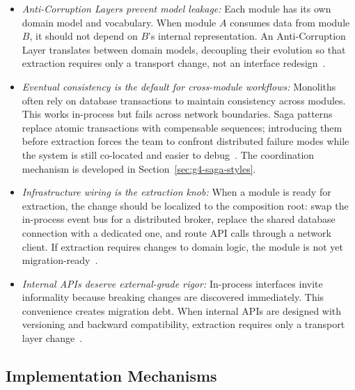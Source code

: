 \begin{itemize}[itemsep=8pt,topsep=2pt]
  \item \emph{Anti-Corruption Layers prevent model leakage:} Each module has its own domain model and vocabulary. When module $A$ consumes data from module $B$, it should not depend on $B$'s internal representation. An Anti-Corruption Layer translates between domain models, decoupling their evolution so that extraction requires only a transport change, not an interface redesign~\cite{evans2003ddd}.

  \item \emph{Eventual consistency is the default for cross-module workflows:} Monoliths often rely on database transactions to maintain consistency across modules. This works in-process but fails across network boundaries. Saga patterns replace atomic transactions with compensable sequences; introducing them before extraction forces the team to confront distributed failure modes while the system is still co-located and easier to debug~\cite{richardson2018microservices,newman2019monolith}. The coordination mechanism is developed in Section~\ref{sec:g4-saga-styles}.

  \item \emph{Infrastructure wiring is the extraction knob:} When a module is ready for extraction, the change should be localized to the composition root: swap the in-process event bus for a distributed broker, replace the shared database connection with a dedicated one, and route API calls through a network client. If extraction requires changes to domain logic, the module is not yet migration-ready~\cite{ghemawat2023towards}.

  \item \emph{Internal APIs deserve external-grade rigor:} In-process interfaces invite informality because breaking changes are discovered immediately. This convenience creates migration debt. When internal APIs are designed with versioning and backward compatibility, extraction requires only a transport layer change~\cite{parnas1972informationhiding}.
\end{itemize}

\subsection*{Implementation Mechanisms}

